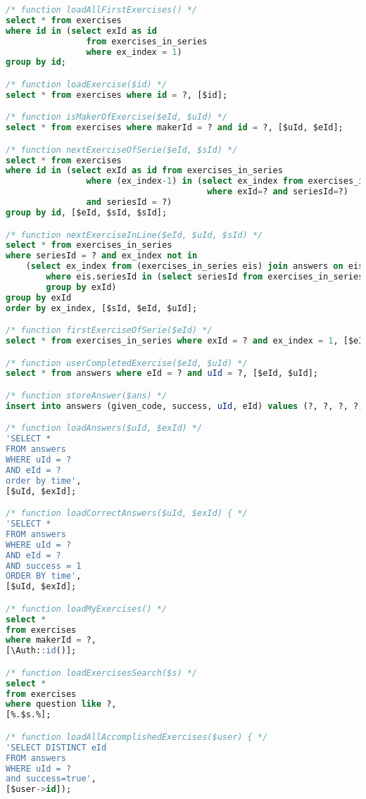 \begin{lstlisting}[language=sql]
/* function loadAllFirstExercises() */
select * from exercises
where id in (select exId as id
                from exercises_in_series
                where ex_index = 1)
group by id;

/* function loadExercise($id) */
select * from exercises where id = ?, [$id];

/* function isMakerOfExercise($eId, $uId) */
select * from exercises where makerId = ? and id = ?, [$uId, $eId];

/* function nextExerciseOfSerie($eId, $sId) */
select * from exercises
where id in (select exId as id from exercises_in_series
                where (ex_index-1) in (select ex_index from exercises_in_series
                                        where exId=? and seriesId=?)
                and seriesId = ?)
group by id, [$eId, $sId, $sId];

/* function nextExerciseInLine($eId, $uId, $sId) */
select * from exercises_in_series
where seriesId = ? and ex_index not in
    (select ex_index from (exercises_in_series eis) join answers on eis.exId = eId
        where eis.seriesId in (select seriesId from exercises_in_series where exId=?) and uId=?
        group by exId)
group by exId
order by ex_index, [$sId, $eId, $uId];

/* function firstExerciseOfSerie($eId) */
select * from exercises_in_series where exId = ? and ex_index = 1, [$eId];

/* function userCompletedExercise($eId, $uId) */
select * from answers where eId = ? and uId = ?, [$eId, $uId];

/* function storeAnswer($ans) */
insert into answers (given_code, success, uId, eId) values (?, ?, ?, ?), [$ans->given_code, $ans->success, $ans->uId, $ans->eId];

/* function loadAnswers($uId, $exId) */
'SELECT *
FROM answers
WHERE uId = ?
AND eId = ?
order by time',
[$uId, $exId];

/* function loadCorrectAnswers($uId, $exId) { */
'SELECT *
FROM answers
WHERE uId = ?
AND eId = ?
AND success = 1
ORDER BY time',
[$uId, $exId];

/* function loadMyExercises() */
select *
from exercises
where makerId = ?,
[\Auth::id()];

/* function loadExercisesSearch($s) */
select *
from exercises
where question like ?,
[%.$s.%];

/* function loadAllAccomplishedExercises($user) { */
'SELECT DISTINCT eId
FROM answers
WHERE uId = ?
and success=true',
[$user->id]);

\end{lstlisting}
